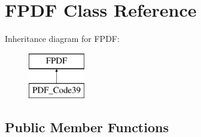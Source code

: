 \hypertarget{classFPDF}{\section{F\+P\+D\+F Class Reference}
\label{classFPDF}
}
Inheritance diagram for F\+P\+D\+F\+:\begin{figure}[H]
\begin{center}
\leavevmode
\includegraphics[height=2.000000cm]{d5/dd8/classFPDF}
\end{center}
\end{figure}
\subsection*{Public Member Functions}
